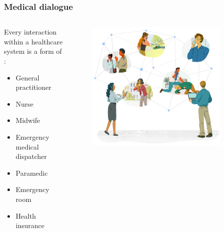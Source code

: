 \begin{frame}[t]
    \frametitle{Medical dialogue}
    \begin{columns}[t]
        \begin{column}{0.4\textwidth}
            Every interaction within a healthcare system is a form of :
            \begin{itemize}
                \item <1> General practitioner
                \item <1> Nurse
                \item <1> Midwife
                \item <1> Emergency medical dispatcher
                \item <1> Paramedic
                \item <1> Emergency room
                \item <1> Health insurance
            \end{itemize}
        \end{column}
        \begin{column}{0.6\textwidth}
            \vspace{-2em}
            \begin{figure}[t]
                \centering
                \includegraphics[width=0.9\textwidth]{figures/corti_sketch_conversations.png}
            \end{figure}
        \end{column}
    \end{columns}

\end{frame}


